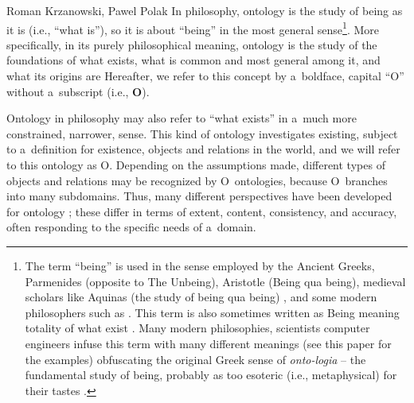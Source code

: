 \begin{artengenv2auth}{Roman Krzanowski, Pawel Polak}
In philosophy, ontology is the study of being as it is (i.e., ``what is''), so it is about ``being'' in the most general sense\footnote{The term ``being'' is used in the sense employed by the Ancient Greeks, Parmenides (opposite to The Unbeing), Aristotle (Being qua being), medieval scholars like Aquinas (the study of being qua being)
\parencite[][]{kerr_aquinas_2022}, %
 and some modern philosophers such as 
\parencites[][]{jacquette_ontology_2002}[][]{strozewski_ontologia_2004}[or][]{perzanowski_rozprawa_2015}. %
 This term is also sometimes written as Being meaning totality of what exist 
\parencite[][p.160]{kenny_new_2012}. %
 Many modern philosophies, scientists computer engineers infuse this term with many different meanings (see this paper for the examples) obfuscating the original Greek sense of \textit{onto-logia} -- the fundamental study of being, probably as too esoteric (i.e., metaphysical) for their tastes 
\parencites[see also][]{kenny_new_2012}[][]{hofweber_logic_2021}.%
}. More specifically, in its purely philosophical meaning, ontology is the study of the foundations of what exists, what is common and most general among it, and what its origins are 
\parencites[see, e.g.,][]{jacquette_ontology_2002}[][p.32]{strozewski_ontologia_2004} %
 Hereafter, we refer to this concept by a~boldface, capital ``O'' without a~subscript (i.e., \textbf{O}).

Ontology in philosophy may also refer to ``what exists'' in a~much more constrained, narrower, sense. This kind of ontology investigates existing, subject to a~definition for existence, objects and relations in the world, and we will refer to this ontology as O. Depending on the assumptions made, different types of objects and relations may be recognized by O~ontologies, because O~branches into many subdomains. Thus, many different perspectives have been developed for ontology
\parencites*[e.g.,][]{quine_word_1960}[][]{jacquette_ontology_2002}[][]{strozewski_ontologia_2004}[][]{baker_metaphysics_2007}[][]{chalmers_metametaphysics_2009}[][]{effingham_introduction_2013}[][]{ingarden_controversy_2013}[][]{ingarden_controversy_2016}[][]{berto_ontology_2015}[][]{perzanowski_rozprawa_2015}[][]{thomasson_ontology_2015}[][]{hofweber_logic_2021}; %
 these differ in terms of extent, content, consistency, and accuracy, often responding to the specific needs of a~domain.


\end{artengenv2auth}
